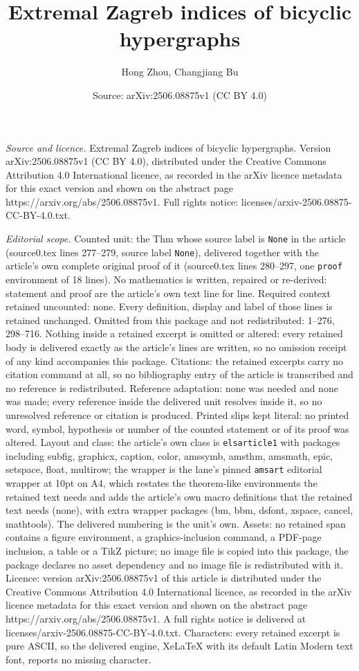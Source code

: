 \documentclass[10pt,a4paper]{amsart}
\title[Extremal Zagreb indices of bicyclic hypergraphs]{Extremal Zagreb indices of bicyclic hypergraphs}
\author{Hong Zhou, Changjiang Bu}
\date{Source: arXiv:2506.08875v1 (CC BY 4.0)}
\begin{document}
\maketitle

\noindent\emph{Source and licence.} Extremal Zagreb indices of bicyclic hypergraphs. Version arXiv:2506.08875v1 (CC BY 4.0), distributed under the Creative Commons Attribution 4.0 International licence, as recorded in the arXiv licence metadata for this exact version and shown on the abstract page https://arxiv.org/abs/2506.08875v1. Full rights notice: licenses/arxiv-2506.08875-CC-BY-4.0.txt.\par\smallskip

\noindent\textit{Editorial scope.} Counted unit: the Thm whose source label is \texttt{None} in the article (source0.tex lines 277--279, source label \texttt{None}), delivered together with the article's own complete original proof of it (source0.tex lines 280--297, one \texttt{proof} environment of 18 lines). No mathematics is written, repaired or re-derived: statement and proof are the article's own text line for line. Required context retained uncounted: none. Every definition, display and label of those lines is retained unchanged. Omitted from this package and not redistributed: 1--276, 298--716. Nothing inside a retained excerpt is omitted or altered: every retained body is delivered exactly as the article's lines are written, so no omission receipt of any kind accompanies this package. Citations: the retained excerpts carry no citation command at all, so no bibliography entry of the article is transcribed and no reference is redistributed. Reference adaptation: none was needed and none was made; every reference inside the delivered unit resolves inside it, so no unresolved reference or citation is produced. Printed slips kept literal: no printed word, symbol, hypothesis or number of the counted statement or of its proof was altered. Layout and class: the article's own class is \texttt{elsarticle1} with packages including subfig, graphicx, caption, color, amssymb, amsthm, amsmath, epic, setspace, float, multirow; the wrapper is the lane's pinned \texttt{amsart} editorial wrapper at 10pt on A4, which restates the theorem-like environments the retained text needs and adds the article's own macro definitions that the retained text needs (none), with extra wrapper packages (bm, bbm, dsfont, xspace, cancel, mathtools). The delivered numbering is the unit's own. Assets: no retained span contains a figure environment, a graphics-inclusion command, a PDF-page inclusion, a table or a TikZ picture; no image file is copied into this package, the package declares no asset dependency and no image file is redistributed with it. Licence: version arXiv:2506.08875v1 of this article is distributed under the Creative Commons Attribution 4.0 International licence, as recorded in the arXiv licence metadata for this exact version and shown on the abstract page https://arxiv.org/abs/2506.08875v1. A full rights notice is delivered at licenses/arxiv-2506.08875-CC-BY-4.0.txt. Characters: every retained excerpt is pure ASCII, so the delivered engine, XeLaTeX with its default Latin Modern text font, reports no missing character.
\end{document}
